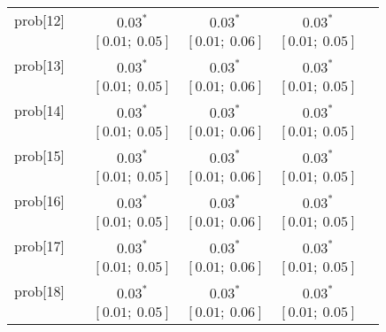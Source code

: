 \begin{table}
\begin{center}
\begin{tabular}{l c c c c c }
prob[12]    &                                  & $0.03^{*}$                & $0.03^{*}$                & $0.03^{*}$              &                         \\
            &                                  & $[0.01;\ 0.05]$           & $[0.01;\ 0.06]$           & $[0.01;\ 0.05]$         &                         \\
prob[13]    &                                  & $0.03^{*}$                & $0.03^{*}$                & $0.03^{*}$              &                         \\
            &                                  & $[0.01;\ 0.05]$           & $[0.01;\ 0.06]$           & $[0.01;\ 0.05]$         &                         \\
prob[14]    &                                  & $0.03^{*}$                & $0.03^{*}$                & $0.03^{*}$              &                         \\
            &                                  & $[0.01;\ 0.05]$           & $[0.01;\ 0.06]$           & $[0.01;\ 0.05]$         &                         \\
prob[15]    &                                  & $0.03^{*}$                & $0.03^{*}$                & $0.03^{*}$              &                         \\
            &                                  & $[0.01;\ 0.05]$           & $[0.01;\ 0.06]$           & $[0.01;\ 0.05]$         &                         \\
prob[16]    &                                  & $0.03^{*}$                & $0.03^{*}$                & $0.03^{*}$              &                         \\
            &                                  & $[0.01;\ 0.05]$           & $[0.01;\ 0.06]$           & $[0.01;\ 0.05]$         &                         \\
prob[17]    &                                  & $0.03^{*}$                & $0.03^{*}$                & $0.03^{*}$              &                         \\
            &                                  & $[0.01;\ 0.05]$           & $[0.01;\ 0.06]$           & $[0.01;\ 0.05]$         &                         \\
prob[18]    &                                  & $0.03^{*}$                & $0.03^{*}$                & $0.03^{*}$              &                         \\
            &                                  & $[0.01;\ 0.05]$           & $[0.01;\ 0.06]$           & $[0.01;\ 0.05]$         &                         \\

\end{tabular}
\end{center}
\end{table}
